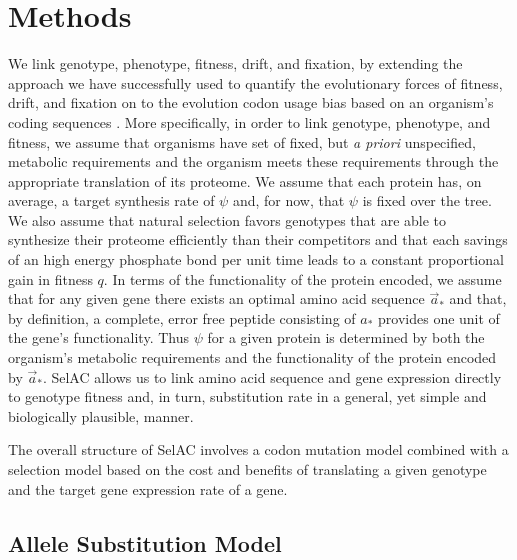 \documentclass{article}
\newcommand{\selac}{SelAC\xspace}
\newcommand{\aopt}{\ensuremath{a_*}\xspace}
\newcommand{\aoptvec}{\ensuremath{\Vec{a}_*}\xspace}
\newcommand{\psiprime}{\ensuremath{\psi^\prime}\xspace}
\begin{document}
\section*{Methods}\label{sec:methods}
We link genotype, phenotype, fitness, drift, and fixation, by extending the approach we have successfully used to quantify the evolutionary forces of fitness, drift, and fixation on to the evolution codon usage bias based on an organism's coding sequences \citep{GilchristAndWagner2006,Gilchrist2007,ShahAndGilchrist2011,GilchristEtAl2015}.
More specifically, in order to link genotype, phenotype, and fitness, we assume that organisms have set of fixed, but \emph{a priori} unspecified, metabolic requirements and the organism meets these requirements through the appropriate translation of its proteome.
We assume that each protein has, on average, a target synthesis rate of $\psi$ and, for now, that $\psi$ is fixed over the tree.
We also assume that natural selection favors genotypes that are able to synthesize their proteome efficiently than their competitors and that each savings of an high energy phosphate bond per unit time leads to a constant proportional gain in fitness $q$.
In terms of the functionality of the protein encoded, we assume that for any given gene there exists an optimal amino acid sequence \aoptvec and that, by definition, a complete, error free peptide consisting of \aopt provides one unit of the gene's functionality.
Thus $\psi$ for a given protein is determined by both the organism's metabolic requirements and the functionality of the protein encoded by \aoptvec.
\selac allows us to link amino acid sequence and gene expression directly to genotype fitness and, in turn, substitution rate in a general, yet simple and biologically plausible, manner.

The overall structure of \selac involves a codon mutation model combined with a selection model based on the cost and benefits of translating a given genotype and the target gene expression rate of a gene.

\subsection*{Allele Substitution Model}
\end{document}
